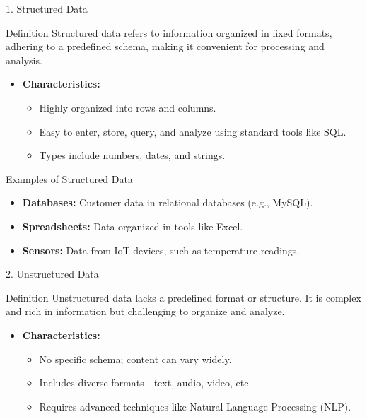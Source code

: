 \documentclass[aspectratio=169]{beamer}
\begin{document}
\begin{frame}[fragile]{1. Structured Data}
    \begin{block}{Definition}
        Structured data refers to information organized in fixed formats, adhering to a predefined schema, making it convenient for processing and analysis.
    \end{block}

    \begin{itemize}
        \item \textbf{Characteristics:}
        \begin{itemize}
            \item Highly organized into rows and columns.
            \item Easy to enter, store, query, and analyze using standard tools like SQL.
            \item Types include numbers, dates, and strings.
        \end{itemize}
    \end{itemize}
\end{frame}

\begin{frame}[fragile]{Examples of Structured Data}
    \begin{itemize}
        \item \textbf{Databases:} Customer data in relational databases (e.g., MySQL).
        \item \textbf{Spreadsheets:} Data organized in tools like Excel.
        \item \textbf{Sensors:} Data from IoT devices, such as temperature readings.
    \end{itemize}
\end{frame}

\begin{frame}[fragile]{2. Unstructured Data}
    \begin{block}{Definition}
        Unstructured data lacks a predefined format or structure. It is complex and rich in information but challenging to organize and analyze.
    \end{block}
    
    \begin{itemize}
        \item \textbf{Characteristics:}
        \begin{itemize}
            \item No specific schema; content can vary widely.
            \item Includes diverse formats—text, audio, video, etc.
            \item Requires advanced techniques like Natural Language Processing (NLP).
        \end{itemize}
    \end{itemize}
\end{frame}
\end{document}
